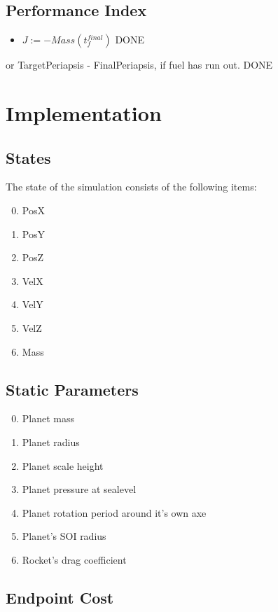 \documentclass[11pt]{report}
\newcommand{\DONE}{{DONE}}
\begin{document}
\section{Performance Index}

\begin{itemize}
\item $J := - Mass(t_f^{final})$ \DONE
\end{itemize}
or TargetPeriapsis - FinalPeriapsis, if fuel has run out. \DONE

\chapter{Implementation}

\section{States}

The state of the simulation consists of the following items:

\begin{enumerate}
\setcounter{enumi}{-1}
\item PosX
\item PosY
\item PosZ
\item VelX
\item VelY
\item VelZ
\item Mass
\end{enumerate}

\section{Static Parameters}

\begin{enumerate}
\setcounter{enumi}{-1}
\item Planet mass
\item Planet radius
\item Planet scale height
\item Planet pressure at sealevel
\item Planet rotation period around it's own axe
\item Planet's SOI radius
\item Rocket's drag coefficient
\end{enumerate}

\section{Endpoint Cost}
\end{document}
